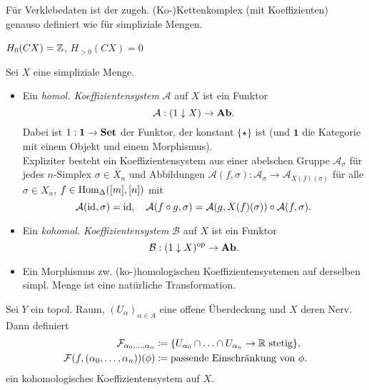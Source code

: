 \documentclass{cheat-sheet}
\begin{document}
\begin{defn}
  Für Verklebedaten ist der zugeh. (Ko-)Kettenkomplex (mit Koeffizienten) genauso definiert wie für simpliziale Mengen.
\end{defn}

\begin{prop}
  $H_0(CX) = \mathbb{Z}$, $H_{>0}(CX) = 0$
\end{prop}



\begin{defn}
  Sei $X$ eine simpliziale Menge.
  \begin{itemize}
    \item Ein \emph{homol. Koeffizientensystem} $\mathcal{A}$ auf $X$ ist ein Funktor
    \[ \mathcal{A} : (1 \downarrow X) \to \mathbf{Ab}. \]
    Dabei ist $1 : \mathbf{1} \to \mathbf{Set}$ der Funktor, der konstant $\{ \star \}$ ist (und $\mathbf{1}$ die Kategorie mit einem Objekt und einem Morphismus).\\
    Expliziter besteht ein Koeffizientensystem aus einer abelschen Gruppe $\mathcal{A}_\sigma$ für jedes $n$-Simplex $\sigma \in X_n$ und Abbildungen $\mathcal{A}(f, \sigma) : \mathcal{A}_\sigma \to \mathcal{A}_{X(f)(\sigma)}$ für alle $\sigma \in X_n$, $f \in \operatorname{Hom}_{\Delta}([m], [n])$ mit
    \[
      \mathcal{A}(\operatorname{id}, \sigma) = \operatorname{id}, \quad
      \mathcal{A}(f \circ g, \sigma) = \mathcal{A}(g, X(f)(\sigma)) \circ \mathcal{A}(f, \sigma).
    \]
    \item Ein \emph{kohomol. Koeffizientensystem} $\mathcal{B}$ auf $X$ ist ein Funktor
    \[ \mathcal{B} : (1 \downarrow X)^{\mathrm{op}} \to \mathbf{Ab}. \]
    \item Ein Morphismus zw. (ko-)homologischen Koeffizientensystemen auf derselben simpl. Menge ist eine natürliche Transformation.
  \end{itemize}
\end{defn}


\begin{bsp}
  Sei $Y$ ein topol. Raum, $(U_\alpha)_{\alpha \in A}$ eine offene Überdeckung und $X$ deren Nerv. Dann definiert
  \begin{align*}
    \mathcal{F}_{\alpha_0, \ldots, \alpha_n} & \coloneqq \{ U_{\alpha_0} \cap \ldots \cap U_{\alpha_n} \to \mathbb{R} \text{ stetig} \}, \\
    \mathcal{F}(f, (\alpha_0, \ldots, \alpha_n))(\phi) & \coloneqq \text{passende Einschränkung von $\phi$}.
  \end{align*}
  ein kohomologisches Koeffizientensystem auf $X$.
\end{bsp}
\end{document}

